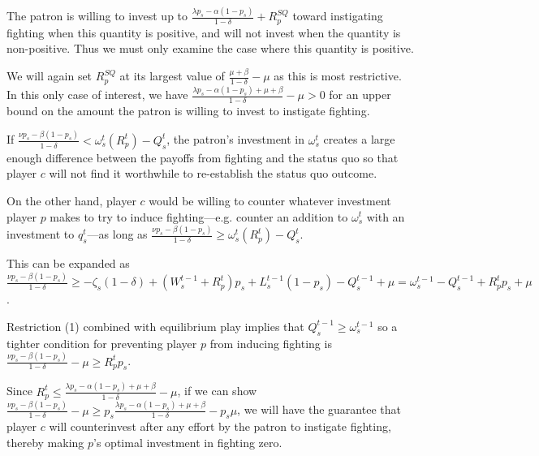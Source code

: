 \documentclass[11pt,letterpaper, notitlepage]{article}
\newcommand{\de}{\delta}
\begin{document}
The patron is willing to invest up to $\frac{\lambda p_s - \alpha (1-p_s)}{1 -\de} +R_p^{SQ}$ toward instigating fighting when this quantity is positive, and will not invest when the quantity is non-positive. Thus we must only examine the case where this quantity is positive.

We will again set $R_p^{SQ}$ at its largest value of $\frac{\mu + \beta}{1-\de} -\mu$ as this is most restrictive. In this only case of interest, we have $\frac{\lambda p_s - \alpha (1-p_s) + \mu + \beta}{1 - \de} -\mu> 0$ for an upper bound on the amount the patron is willing to invest to instigate fighting.

If $\frac{\nu p_s - \beta (1-p_s)}{1 -\de}  < \omega_s^t\left(R_p^t\right) - Q_s^t$, the patron's investment in $\omega_s^t$ creates a large enough difference between the payoffs from fighting and the status quo so that player $c$ will not find it worthwhile to re-establish the status quo outcome.

On the other hand, player $c$ would be willing to counter whatever investment player $p$ makes to try to induce fighting---e.g. counter an addition to $\omega_s^t$ with an investment to $q_s^t$---as long as $\frac{\nu p_s - \beta (1-p_s)}{1 -\de}  \geq \omega_s^t\left(R_p^t\right) - Q_s^t$.

This can be expanded as $\frac{\nu p_s - \beta (1-p_s)}{1 -\de}  \geq -\zeta_{s}(1-\de) + (W_s^{t-1}+R_p^t)p_s + L_s^{t-1}(1-p_s) - Q_s^{t-1} +\mu = \omega_s^{t-1} - Q_s^{t-1} +R_p^t p_s + \mu$. 

Restriction (1) combined with equilibrium play implies that  $Q_s^{t-1} \geq \omega_s^{t-1}$ so a tighter condition for preventing player $p$ from inducing fighting is $\frac{\nu p_s - \beta (1-p_s)}{1 -\de} - \mu \geq R_p^t p_s$. 

Since $R_p^t \leq \frac{\lambda p_s - \alpha (1-p_s) + \mu + \beta}{1 - \de} -\mu$, if we can show $\frac{\nu p_s - \beta (1-p_s)}{1 -\de}  - \mu \geq p_s \frac{\lambda p_s - \alpha (1-p_s) + \mu + \beta}{1 - \de} - p_s \mu$, we will have the guarantee that player $c$ will counterinvest after any effort by the patron to instigate fighting, thereby making $p$'s optimal investment in fighting zero.
\end{document}
